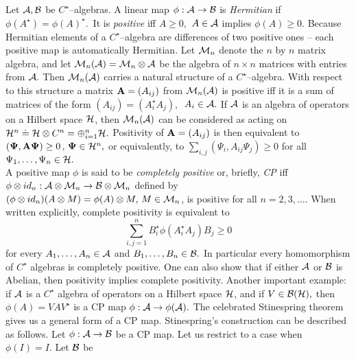 \documentclass[12pt]{article}
\def\be{\begin{equation}} \def\ee{\end{equation}}
\begin{document}
Let ${\cal A, B}$ be $C^{\star}$--algebras.  A linear map $\phi :  {\cal A}
\rightarrow {\cal B}$ is {\sl Hermitian} if $\phi  (A^{\star}) = \phi
 (A)^{\star }. $\ It is {\sl positive} iff $A\geq 0 , $ $A\in {\cal A}$ implies $
\phi  (A)\geq 0 . $ Because Hermitian elements of a $C^{\star}$--algebra are
differences of two positive ones -- each positive map is automatically
Hermitian.  Let ${\cal M}_n$ denote the $n$ by $n$ matrix algebra,  and let $
{\cal M}_n ({\cal A}) = {\cal M}_n \otimes {\cal A}$ be the 
algebra of $n\times n$ matrices with entries from ${\cal A}. $ Then 
$
{\cal M}_n ({\cal A})$ carries a natural structure of a $C^{\star}$--algebra.  
With respect to this structure a  matrix ${\bf 
A}= (A_{ij})$ from ${\cal M}_n  ({\cal A})$ is positive iff it is  a sum of
matrices of the form $ (A_{ij}) =  (A_i^{\star } A_j ), \,  $ $A_i\in {\cal A} . $ 
If ${\cal 
A}$ is an algebra of operators on a Hilbert space ${\cal H}$,  then ${\cal M}
_n ({\cal A})$ can be considered as acting on ${\cal H}^n \doteq {\cal H}
\otimes C^n = \oplus_{i=1}^n {\cal H} . $ Positivity of ${\bf A}= (A_{ij})$ is
then equivalent to $ ({\bf \Psi}, {\bf A} {\bf \Psi} )\geq 0\,  ,  \,  {\bf \Psi}
\in {\cal H}^n ,  $ or equivalently,  to $\sum_{i, j}  (\Psi_i ,  A_{ij} \Psi_j
) \geq 0 $ for all $\Psi_1, \ldots , \Psi_n \in {\cal H} . $ \\
A positive map $
\phi$ is said to be {\sl completely positive} or,  briefly,   {\sl CP}
 iff $\phi \otimes id_n
: {\cal A }\otimes {\cal M}_n \rightarrow {\cal B}\otimes {\cal M}_n $ defined
by $  (\phi\otimes id_n)  (A\otimes M ) = \phi  (A)\otimes M , \,  M\in {\cal M}_n
$, is positive for all $n=2, 3, \ldots . $ When written explicitly,  complete
positivity is equivalent to \be \sum_{i, j=1}^n B_i^{\star}\phi
 (A_i^{\star}A_j)B_j \geq 0 \ee for every $A_1, \ldots , A_n \in {\cal A}$ and
$B_1, \ldots , B_n \in {\cal B} . $ In particular every homomorphism of 
$C^{\star}$ algebras is completely positive.  One can also show that if either 
${\cal A}$ or ${\cal B}$ is Abelian,  then positivity implies complete
positivity.  Another important example:  if ${\cal A}$ is a $C^{\star }$ 
algebra of
operators on a Hilbert space ${\cal H}$,  and if $V\in {\cal B} ({\cal H}) , $
then $\phi  (A) = VAV^{\star}$ is a CP map $\phi :  {\cal A}
\rightarrow \phi ({\cal A}) . $ The celebrated Stinespring theorem gives us a
general form of a CP map.  Stinespring's construction can be
described as follows.  Let $\phi :  {\cal A}\rightarrow {\cal B}$ be a
CP map.  Let us restrict to a case when $\phi  (I)=I . $ 
Let ${\cal B}$ be
\end{document}
